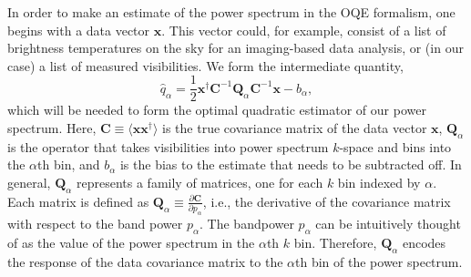 \documentclass[twocolumn,numberedappendix]{emulateapj} \shorttitle{PSA64}
\newcommand{\x}{\mathbf{x}} \newcommand{\xhat}{\hat{\mathbf{x}}}
\begin{document}
In order to make an estimate of the power spectrum in the OQE formalism, one begins with a data
vector $\x$. This vector could, for example, consist of a list of brightness temperatures on the sky
for an imaging-based data analysis, or (in our case) a list of measured visibilities. We form
the intermediate quantity,
\begin{equation}
\label{eqn:qalpha}
   \hat{q}_{\alpha} = \frac{1}{2}\x^\dagger\mathbf{C}^{-1}\mathbf{Q}_{\alpha}\mathbf{C}^{-1}\x - b_{\alpha},
\end{equation}
which will be needed to form the optimal quadratic estimator of our power spectrum.
Here, $\mathbf{C} \equiv \langle \x \x^\dagger \rangle$ is the true covariance matrix of the data vector $\x$, 
$\mathbf{Q}_{\alpha}$ is the operator that takes visibilities into power spectrum
$k$-space and bins into the ${\alpha}$th bin, and $b_{\alpha}$ is the bias to
the estimate that needs to be subtracted off. In general, $\mathbf{Q}_{\alpha}$
represents a family of matrices, one for each $k$ bin indexed by $\alpha$. Each matrix
is defined as
$\mathbf{Q}_{\alpha} \equiv
\frac{\partial{\mathbf{C}}}{\partial p_{\alpha}}$, i.e., the derivative of the covariance
matrix with respect to the band power $p_\alpha$. 
The bandpower $p_\alpha$
can be intuitively thought of as the value of the power spectrum in the $\alpha$th
$k$ bin.  Therefore, $\mathbf{Q}_{\alpha}$ encodes the response of the data
covariance matrix to the $\alpha$th bin of the power spectrum. 
\end{document}
